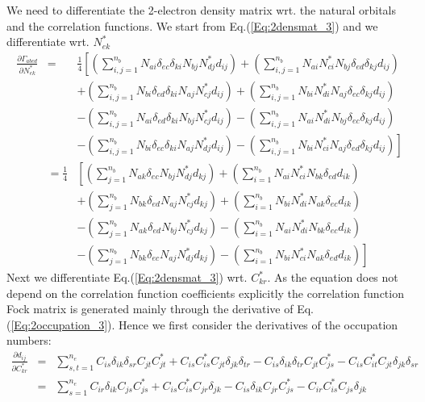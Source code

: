 \documentclass[pra]{revtex4-1}
\begin{document}
We need to differentiate the 2-electron density matrix wrt. the natural orbitals and the
correlation functions. We start from Eq.(\ref{Eq:2densmat_3}) and we differentiate wrt.
$N^*_{ek}$
\begin{eqnarray}
  \frac{\partial\Gamma_{abcd}}{\partial N^*_{ek}}
  &=& \frac{1}{4}
      \left[
      \left(\sum_{i,j=1}^{n_b} N_{ai}\delta_{ec}\delta_{ki}N_{bj}N^*_{dj}d_{ij}\right)
     +\left(\sum_{i,j=1}^{n_b} N_{ai}N^*_{ci}N_{bj}\delta_{ed}\delta_{kj}d_{ij}\right)
      \right.
      \nonumber \\
  &&+ \left(\sum_{i,j=1}^{n_b} N_{bi}\delta_{ed}\delta_{ki}N_{aj}N^*_{cj}d_{ij}\right)
    + \left(\sum_{i,j=1}^{n_b} N_{bi}N^*_{di}N_{aj}\delta_{ec}\delta_{kj}d_{ij}\right)
      \nonumber \\
  &&- \left(\sum_{i,j=1}^{n_b} N_{ai}\delta_{ed}\delta_{ki}N_{bj}N^*_{cj}d_{ij}\right)
    - \left(\sum_{i,j=1}^{n_b} N_{ai}N^*_{di}N_{bj}\delta_{ec}\delta_{kj}d_{ij}\right)
      \nonumber \\
  &&- \left.
      \left(\sum_{i,j=1}^{n_b} N_{bi}\delta_{ec}\delta_{ki}N_{aj}N^*_{dj}d_{ij}\right)
    - \left(\sum_{i,j=1}^{n_b} N_{bi}N^*_{ci}N_{aj}\delta_{ed}\delta_{kj}d_{ij}\right)
      \right] \\
  &= \frac{1}{4} &
      \left[
      \left(\sum_{j=1}^{n_b} N_{ak}\delta_{ec}N_{bj}N^*_{dj}d_{kj}\right)
     +\left(\sum_{i=1}^{n_b} N_{ai}N^*_{ci}N_{bk}\delta_{ed}d_{ik}\right)
      \right.
      \nonumber \\
  &&+ \left(\sum_{j=1}^{n_b} N_{bk}\delta_{ed}N_{aj}N^*_{cj}d_{kj}\right)
    + \left(\sum_{i=1}^{n_b} N_{bi}N^*_{di}N_{ak}\delta_{ec}d_{ik}\right)
      \nonumber \\
  &&- \left(\sum_{j=1}^{n_b} N_{ak}\delta_{ed}N_{bj}N^*_{cj}d_{kj}\right)
    - \left(\sum_{i=1}^{n_b} N_{ai}N^*_{di}N_{bk}\delta_{ec}d_{ik}\right)
      \nonumber \\
  &&- \left.
      \left(\sum_{j=1}^{n_b} N_{bk}\delta_{ec}N_{aj}N^*_{dj}d_{kj}\right)
    - \left(\sum_{i=1}^{n_b} N_{bi}N^*_{ci}N_{ak}\delta_{ed}d_{ik}\right)
      \right]
      \label{Eq:2densmat_dN}
\end{eqnarray}
Next we differentiate Eq.(\ref{Eq:2densmat_3}) wrt. $C^*_{kr}$. As the equation does not
depend on the correlation function coefficients explicitly the correlation function 
Fock matrix is generated mainly through the derivative of Eq.(\ref{Eq:2occupation_3}).
Hence we first consider the derivatives of the occupation numbers:
\begin{eqnarray}
  \frac{\partial d_{ij}}{\partial C^*_{kr}}
  &=& \sum_{s,t=1}^{n_e}
      C_{is}\delta_{ik}\delta_{sr}C_{jt}C^*_{jt}
     +C_{is}C^*_{is}C_{jt}\delta_{jk}\delta_{tr}
     -C_{is}\delta_{ik}\delta_{tr}C_{jt}C^*_{js}
     -C_{is}C^*_{it}C_{jt}\delta_{jk}\delta_{sr} \\
  &=& \sum_{s=1}^{n_e}
      C_{ir}\delta_{ik}C_{js}C^*_{js}
     +C_{is}C^*_{is}C_{jr}\delta_{jk}
     -C_{is}\delta_{ik}C_{jr}C^*_{js}
     -C_{ir}C^*_{is}C_{js}\delta_{jk}
     \label{Eq:deriv_2occupation}
\end{eqnarray}
\end{document}
